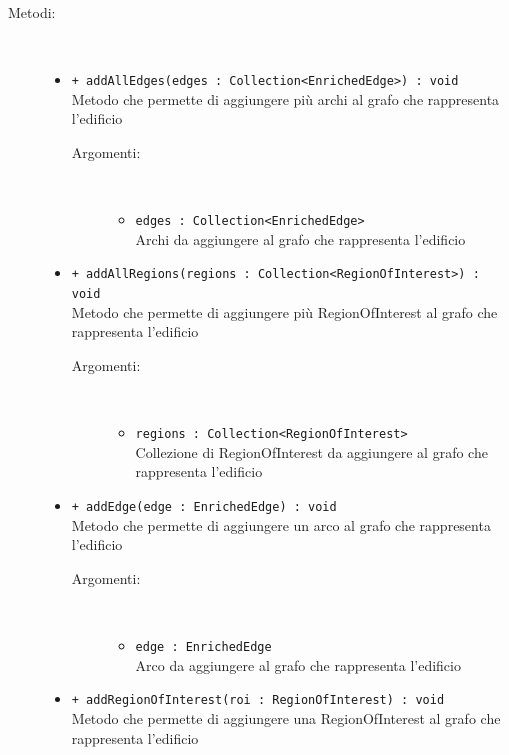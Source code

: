 \documentclass[../DefinizioneDiProdotto.tex]{subfiles}
\begin{document}
\begin{description}
\begin{itemize}
\end{itemize}
\item[Metodi:] \
\begin{itemize}
\item \texttt{+ addAllEdges(edges : Collection<EnrichedEdge>) : void}\\
Metodo che permette di aggiungere più archi al grafo che rappresenta l'edificio
 \begin{description}
\item[Argomenti:] \
\begin{itemize}
\item \texttt{edges : Collection<EnrichedEdge>}\\
Archi da aggiungere al grafo che rappresenta l'edificio\end{itemize}
\end{description}
\item \texttt{+ addAllRegions(regions : Collection<RegionOfInterest>) : void}\\
Metodo che permette di aggiungere più RegionOfInterest al grafo che rappresenta l'edificio
 \begin{description}
\item[Argomenti:] \
\begin{itemize}
\item \texttt{regions : Collection<RegionOfInterest>}\\
Collezione di RegionOfInterest da aggiungere al grafo che rappresenta l'edificio\end{itemize}
\end{description}
\item \texttt{+ addEdge(edge : EnrichedEdge) : void}\\
Metodo che permette di aggiungere un arco al grafo che rappresenta l'edificio
 \begin{description}
\item[Argomenti:] \
\begin{itemize}
\item \texttt{edge : EnrichedEdge}\\
Arco da aggiungere al grafo che rappresenta l'edificio\end{itemize}
\end{description}
\item \texttt{+ addRegionOfInterest(roi : RegionOfInterest) : void}\\
Metodo che permette di aggiungere una RegionOfInterest al grafo che rappresenta l'edificio
 \begin{description}

\end{description}
\end{itemize}
\end{description}
\end{document}
